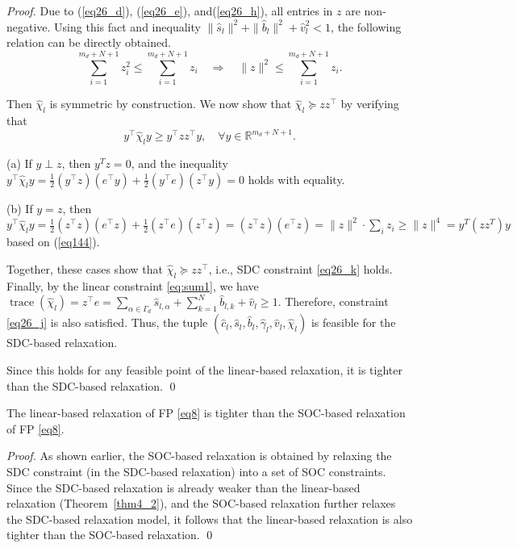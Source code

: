 \documentclass[smallextended,referee,envcountsect,,numbers]{svjour3}
\begin{document}
\begin{proof}
Due to (\ref{eq26_d}), (\ref{eq26_e}), and(\ref{eq26_h}), all entries in $z$ are non-negative. Using this fact and inequality $\|\hat{s}_l\|^2 + \|\hat{b}_l\|^2 + \hat{v}_l^2 < 1$, the following relation can be directly obtained.
\begin{equation} \label{eq144}
\sum_{i=1}^{m_d+N+1} z_i^2 \le \sum_{i=1}^{m_d+N+1} z_i \quad \Rightarrow \quad \|z\|^2 \le \sum_{i=1}^{m_d+N+1} z_i.    
\end{equation}

Then $\hat{\chi}_l$ is symmetric by construction. We now show that $\hat{\chi}_l \succeq zz^\top$ by verifying that
\begin{equation}
y^\top \hat{\chi}_l y \ge y^\top zz^\top y, \quad \forall y \in \mathbb{R}^{m_d + N + 1}.
\end{equation}

(a) If $y \perp z$, then $y^T z = 0$, and the inequality
$y^\top \hat{\chi}_l y = \frac{1}{2}(y^\top z)(e^\top y) + \frac{1}{2}(y^\top e)(z^\top y) = 0$  holds with equality.

(b) If $y = z$, then $y^\top \hat{\chi}_l y = \frac{1}{2}(z^\top z)(e^\top z) + \frac{1}{2}(z^\top e)(z^\top z) = (z^\top z)(e^\top z) = \|z\|^2 \cdot \sum_i z_i\ge \|z\|^4=y^T(zz^T)y$ based on (\ref{eq144}). 

Together, these cases show that $\hat{\chi}_l \succeq zz^\top$, i.e., SDC constraint \eqref{eq26_k} holds. Finally, by the linear constraint \eqref{eq:sum1}, we have $\operatorname{trace}(\hat{\chi}_l) = z^\top e = \sum_{\alpha \in \Gamma_d} \hat{s}_{l,\alpha} + \sum_{k=1}^N \hat{b}_{l,k} + \hat{v}_l \ge 1
$. Therefore, constraint \eqref{eq26_j} is also satisfied. Thus, the tuple $\left(\hat{c}_l, \hat{s}_l, \hat{b}_l, \hat{\gamma}_l, \hat{v}_l, \hat{\chi}_l\right)$ is feasible for the SDC-based relaxation. 

Since this holds for any feasible point of the linear-based relaxation, it is tighter than the SDC-based relaxation. \qed
\end{proof}

\begin{corollary} \label{crl1}
The linear-based relaxation of FP \eqref{eq8} is tighter than the SOC-based relaxation of FP \eqref{eq8}.
\end{corollary}
\begin{proof}
As shown earlier, the SOC-based relaxation is obtained by relaxing the SDC constraint (in the SDC-based relaxation) into a set of SOC constraints. Since the SDC-based relaxation is already weaker than the linear-based relaxation (Theorem~\ref{thm4_2}), and the SOC-based relaxation further relaxes the SDC-based relaxation model, it follows that the linear-based relaxation is also tighter than the SOC-based relaxation. \qed
\end{proof}
\end{document}
